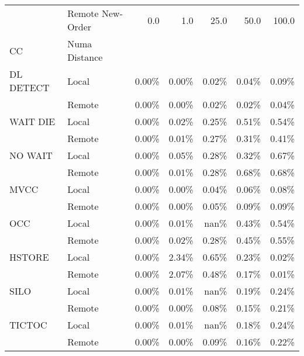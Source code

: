 \begin{tabular}{llrrrrr}
\toprule
       & Remote New-Order &  0.0   &  1.0   &  25.0  &  50.0  &  100.0 \\
CC & Numa Distance &        &        &        &        &        \\
\midrule
DL DETECT & Local &  0.00\% &  0.00\% &  0.02\% &  0.04\% &  0.09\% \\
       & Remote &  0.00\% &  0.00\% &  0.02\% &  0.02\% &  0.04\% \\
WAIT DIE & Local &  0.00\% &  0.02\% &  0.25\% &  0.51\% &  0.54\% \\
       & Remote &  0.00\% &  0.01\% &  0.27\% &  0.31\% &  0.41\% \\
NO WAIT & Local &  0.00\% &  0.05\% &  0.28\% &  0.32\% &  0.67\% \\
       & Remote &  0.00\% &  0.01\% &  0.28\% &  0.68\% &  0.68\% \\
MVCC & Local &  0.00\% &  0.00\% &  0.04\% &  0.06\% &  0.08\% \\
       & Remote &  0.00\% &  0.00\% &  0.05\% &  0.09\% &  0.09\% \\
OCC & Local &  0.00\% &  0.01\% &   nan\% &  0.43\% &  0.54\% \\
       & Remote &  0.00\% &  0.02\% &  0.28\% &  0.45\% &  0.55\% \\
HSTORE & Local &  0.00\% &  2.34\% &  0.65\% &  0.23\% &  0.02\% \\
       & Remote &  0.00\% &  2.07\% &  0.48\% &  0.17\% &  0.01\% \\
SILO & Local &  0.00\% &  0.01\% &   nan\% &  0.19\% &  0.24\% \\
       & Remote &  0.00\% &  0.00\% &  0.08\% &  0.15\% &  0.21\% \\
TICTOC & Local &  0.00\% &  0.01\% &   nan\% &  0.18\% &  0.24\% \\
       & Remote &  0.00\% &  0.00\% &  0.09\% &  0.16\% &  0.22\% \\
\bottomrule
\end{tabular}
